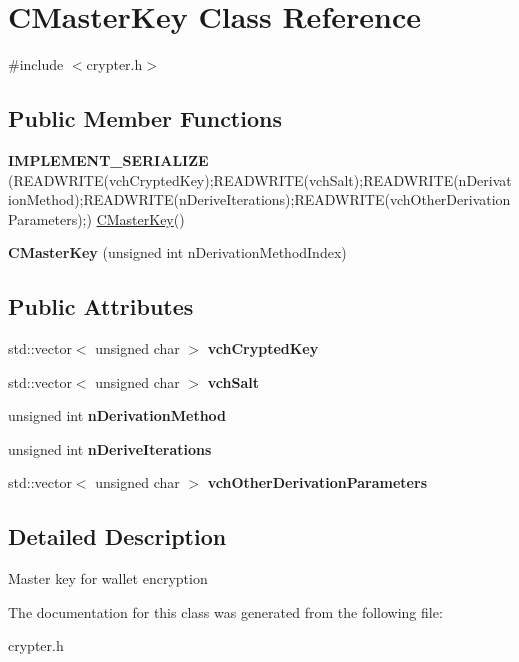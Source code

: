 \hypertarget{class_c_master_key}{}\section{C\+Master\+Key Class Reference}
\label{class_c_master_key}


{\ttfamily \#include $<$crypter.\+h$>$}

\subsection*{Public Member Functions}
\begin{DoxyCompactItemize}
\item 
\mbox{\label{class_c_master_key_a7745f820757abcfcebf42d9ad22a362d}} 
{\bfseries I\+M\+P\+L\+E\+M\+E\+N\+T\+\_\+\+S\+E\+R\+I\+A\+L\+I\+ZE} (R\+E\+A\+D\+W\+R\+I\+TE(vch\+Crypted\+Key);R\+E\+A\+D\+W\+R\+I\+TE(vch\+Salt);R\+E\+A\+D\+W\+R\+I\+TE(n\+Derivation\+Method);R\+E\+A\+D\+W\+R\+I\+TE(n\+Derive\+Iterations);R\+E\+A\+D\+W\+R\+I\+TE(vch\+Other\+Derivation\+Parameters);) \mbox{\hyperlink{class_c_master_key}{C\+Master\+Key}}()
\item 
\mbox{\label{class_c_master_key_a61d5165940d981ef97f0120160737a05}} 
{\bfseries C\+Master\+Key} (unsigned int n\+Derivation\+Method\+Index)
\end{DoxyCompactItemize}
\subsection*{Public Attributes}
\begin{DoxyCompactItemize}
\item 
\mbox{\label{class_c_master_key_ab52e0eaabb0eb3af78fc4879c192e163}} 
std\+::vector$<$ unsigned char $>$ {\bfseries vch\+Crypted\+Key}
\item 
\mbox{\label{class_c_master_key_a00009f4b4feaa2ebe630a0d7cc854d3a}} 
std\+::vector$<$ unsigned char $>$ {\bfseries vch\+Salt}
\item 
\mbox{\label{class_c_master_key_a7a4b1e432a30011297f496441769957f}} 
unsigned int {\bfseries n\+Derivation\+Method}
\item 
\mbox{\label{class_c_master_key_aec53e0be82d1053cf5a70a67fd4cc25d}} 
unsigned int {\bfseries n\+Derive\+Iterations}
\item 
\mbox{\label{class_c_master_key_abfd00b311d5e5cf9ae1a6f3877ed35f7}} 
std\+::vector$<$ unsigned char $>$ {\bfseries vch\+Other\+Derivation\+Parameters}
\end{DoxyCompactItemize}


\subsection{Detailed Description}
Master key for wallet encryption 

The documentation for this class was generated from the following file\+:\begin{DoxyCompactItemize}
\item 
crypter.\+h\end{DoxyCompactItemize}
